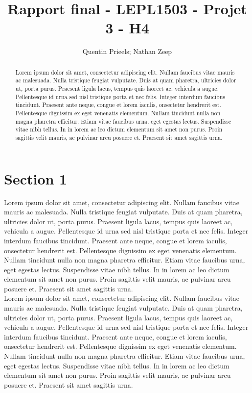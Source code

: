 \documentclass[conference]{report/IEEEtran}
\title{Rapport final - LEPL1503 - Projet 3 - H4}
\author{Quentin Prieels; Nathan Zeep}
\begin{document}
\maketitle

\begin{abstract}
Lorem ipsum dolor sit amet, consectetur adipiscing elit. 
Nullam faucibus vitae mauris ac malesuada. Nulla tristique feugiat vulputate. 
Duis at quam pharetra, ultricies dolor ut, porta purus. 
Praesent ligula lacus, tempus quis laoreet ac, vehicula a augue. 
Pellentesque id urna sed nisl tristique porta et nec felis. 
Integer interdum faucibus tincidunt. Praesent ante neque, congue et lorem iaculis, 
onsectetur hendrerit est. Pellentesque dignissim ex eget venenatis elementum. 
Nullam tincidunt nulla non magna pharetra efficitur. Etiam vitae faucibus urna, 
eget egestas lectus. Suspendisse vitae nibh tellus. 
In in lorem ac leo dictum elementum sit amet non purus. 
Proin sagittis velit mauris, ac pulvinar arcu posuere et. 
Praesent sit amet sagittis urna. 
\end{abstract}

\section{Section 1}
Lorem ipsum dolor sit amet, consectetur adipiscing elit. 
Nullam faucibus vitae mauris ac malesuada. Nulla tristique feugiat vulputate. 
Duis at quam pharetra, ultricies dolor ut, porta purus. 
Praesent ligula lacus, tempus quis laoreet ac, vehicula a augue. 
Pellentesque id urna sed nisl tristique porta et nec felis. 
Integer interdum faucibus tincidunt. Praesent ante neque, congue et lorem iaculis, 
onsectetur hendrerit est. Pellentesque dignissim ex eget venenatis elementum. 
Nullam tincidunt nulla non magna pharetra efficitur. Etiam vitae faucibus urna, 
eget egestas lectus. Suspendisse vitae nibh tellus. 
In in lorem ac leo dictum elementum sit amet non purus. 
Proin sagittis velit mauris, ac pulvinar arcu posuere et. 
Praesent sit amet sagittis urna. \\

Lorem ipsum dolor sit amet, consectetur adipiscing elit. 
Nullam faucibus vitae mauris ac malesuada. Nulla tristique feugiat vulputate. 
Duis at quam pharetra, ultricies dolor ut, porta purus. 
Praesent ligula lacus, tempus quis laoreet ac, vehicula a augue. 
Pellentesque id urna sed nisl tristique porta et nec felis. 
Integer interdum faucibus tincidunt. Praesent ante neque, congue et lorem iaculis, 
onsectetur hendrerit est. Pellentesque dignissim ex eget venenatis elementum. 
Nullam tincidunt nulla non magna pharetra efficitur. Etiam vitae faucibus urna, 
eget egestas lectus. Suspendisse vitae nibh tellus. 
In in lorem ac leo dictum elementum sit amet non purus. 
Proin sagittis velit mauris, ac pulvinar arcu posuere et. 
Praesent sit amet sagittis urna. 
\end{document}
